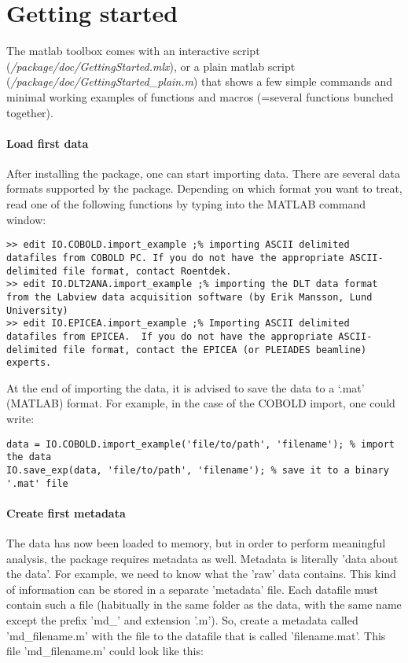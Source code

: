 \section{Getting started}
The matlab toolbox comes with an interactive script (\textit{/package/doc/GettingStarted.mlx}), or a plain matlab script (\textit{/package/doc/GettingStarted\_plain.m}) that shows a few simple commands and minimal working examples of functions and macros (=several functions bunched together). 

\paragraph{Load first data}
After installing the package, one can start importing data. There are several data formats supported by the package. Depending on which format you want to treat, read one of the following functions by typing into the MATLAB command window:
\lstset{language=MATLAB}
\begin{lstlisting}
>> edit IO.COBOLD.import_example ;% importing ASCII delimited datafiles from COBOLD PC. If you do not have the appropriate ASCII-delimited file format, contact Roentdek.
>> edit IO.DLT2ANA.import_example ;% importing the DLT data format from the Labview data acquisition software (by Erik Mansson, Lund University)
>> edit IO.EPICEA.import_example ;% Importing ASCII delimited datafiles from EPICEA.  If you do not have the appropriate ASCII-delimited file format, contact the EPICEA (or PLEIADES beamline) experts.
\end{lstlisting}

At the end of importing the data, it is advised to save the data to a `.mat' (MATLAB) format. For example, in the case of the COBOLD import, one could write:

\begin{lstlisting}
data = IO.COBOLD.import_example('file/to/path', 'filename'); % import the data
IO.save_exp(data, 'file/to/path', 'filename'); % save it to a binary '.mat' file
\end{lstlisting}

\paragraph{Create first metadata}
The data has now been loaded to memory, but in order to perform meaningful analysis, the package requires metadata as well. Metadata is literally 'data about the data'. For example, we need to know what the 'raw' data contains. This kind of information can be stored in a separate 'metadata' file. Each datafile must contain such a file (habitually in the same folder as the data, with the same name except the prefix 'md\_' and extension '.m'). So, create a metadata called 'md\_filename.m' with the file to the datafile that is called 'filename.mat'. This file 'md\_filename.m' could look like this:

